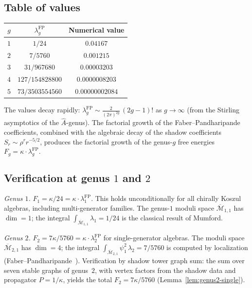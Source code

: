 \documentclass[11pt,reqno]{amsart}
\theoremstyle{definition}
\theoremstyle{remark}
\newcommand{\Mbar}{\overline{\mathcal{M}}}
\numberwithin{equation}{section}
\begin{document}
\subsection{Table of values}\label{subsec:fp-table}

\begin{center}
\renewcommand{\arraystretch}{1.4}
\begin{tabular}{ccc}
\toprule
$g$ & $\lambda_g^{\mathrm{FP}}$ & Numerical value \\
\midrule
$1$ & $1/24$ & $0.04167$ \\
$2$ & $7/5760$ & $0.001215$ \\
$3$ & $31/967680$ & $0.00003203$ \\
$4$ & $127/154828800$ & $0.0000008203$ \\
$5$ & $73/3503554560$ & $0.00000002084$ \\
\bottomrule
\end{tabular}
\end{center}

\noindent The values decay rapidly:
$\lambda_g^{\mathrm{FP}} \sim
\frac{2}{(2\pi)^{2g}}\, (2g-1)!$ as $g \to \infty$
(from the Stirling asymptotics of the $\hat{A}$-genus).
The factorial growth of the Faber--Pandharipande
coefficients, combined with the algebraic decay of the
shadow coefficients $S_r \sim \rho^r r^{-5/2}$,
produces the factorial growth of the genus-$g$ free energies
$F_g = \kappa \cdot \lambda_g^{\mathrm{FP}}$.

\subsection{Verification at genus $1$ and
$2$}\label{subsec:fp-verify}

\emph{Genus $1$.}\enspace
$F_1 = \kappa/24 = \kappa \cdot \lambda_1^{\mathrm{FP}}$.
This holds unconditionally for all chirally Koszul algebras,
including multi-generator families. The genus-$1$ moduli
space $\Mbar_{1,1}$ has $\dim = 1$; the integral
$\int_{\Mbar_{1,1}} \lambda_1 = 1/24$ is the classical
result of Mumford.

\emph{Genus $2$.}\enspace
$F_2 = 7\kappa/5760 = \kappa \cdot
\lambda_2^{\mathrm{FP}}$ for single-generator algebras.
The moduli space $\Mbar_{2,1}$ has $\dim = 4$; the integral
$\int_{\Mbar_{2,1}} \psi_1^2\, \lambda_2 = 7/5760$ is
computed by localization (Faber--Pandharipande~\cite{FP00}).
Verification by shadow tower graph sum:
the sum over seven stable graphs of genus~$2$, with vertex
factors from the shadow data and propagator $P = 1/\kappa$,
yields the total $F_2 = 7\kappa/5760$
(Lemma~\ref{lem:genus2-single}).
\end{document}

